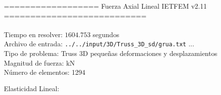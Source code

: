 \documentclass[a4paper,11pt]{article}
\begin{document}

================== Fuerza Axial Lineal IETFEM v2.11 ===========================\\\\


Tiempo en resolver: $1604.753$ segundos \\

Archivo de entrada: \verb|../../input/3D/Truss_3D_sd/grua.txt|  ... \\

Tipo de problema: Truss 3D pequeñas deformaciones y desplazamientos\\ 

Magnitud de fuerza: kN \\

Número de elementos: 1294 \\

\newpage       

Elasticidad Lineal:\\
\end{document}
